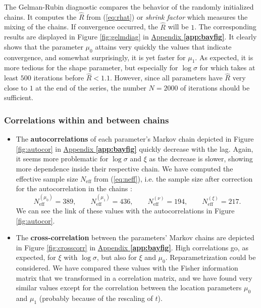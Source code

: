 The Gelman-Rubin diagnostic compares the behavior of the randomly initialized chains. It computes the $\hat{R}$ from (\ref{eq:rhat}) or \emph{shrink factor} which measures the mixing of the chains. If convergence occurred, the $\hat{R}$ will be $1$.
The corresponding results are displayed in Figure \ref{fig:gelmdiag} in \hyperref[app:bayfig]{Appendix \textbf{\ref{app:bayfig}}}. It clearly shows that the parameter $\mu_0$ attains very quickly the values that indicate convergence, and somewhat surprisingly, it is yet faster for $\mu_1$.
As expected, it is more tedious for the shape parameter, but especially for $\log\sigma$ for which takes at least $500$ iterations before $\hat{R}<1.1$. However, since all parameters have $\hat{R}$ very close to $1$ at the end of the series, the number $N=2000$ of iterations should be sufficient.



\subsubsection*{Correlations within and between chains}


\begin{itemize}
	\item The \textbf{autocorrelations} of each parameter's Markov chain depicted in Figure \ref{fig:autocor} in \hyperref[app:bayfig]{Appendix \textbf{\ref{app:bayfig}}} quickly decrease with the lag. Again, it seems more problematic for $\log\sigma$ and $\xi$ as the decrease is slower, showing more dependence inside their respective chain.	
	We have computed the effective sample size $N_{\text{eff}}$ from (\ref{eq:neff}), i.e. the sample size after correction for the autocorrelation in the chains :
	\begin{equation}
		N_{\text{eff}}^{(\mu_0)} = 389, \qquad 	N_{\text{eff}}^{(\mu_1)} = 436, \qquad 	N_{\text{eff}}^{(\nu)} = 194, \qquad	N_{\text{eff}}^{(\xi)} = 217.
	\end{equation}
	We can see the link of these values with the autocorrelations in Figure \ref{fig:autocor}.
	
	\item The \textbf{cross-correlation} between the parameters' Markov chains are depicted in Figure \ref{fig:crosscorr} in \hyperref[app:bayfig]{Appendix \textbf{\ref{app:bayfig}}}. High correlations go, as expected, for $\xi$ with $\log\sigma$, but also for $\xi$ and $\mu_0$. Reparametrization could be considered. We have compared these values with the Fisher information matrix that we transformed in a correlation matrix, and we have found very similar values except for the correlation between the location parameters $\mu_0$ and $\mu_1$ (probably because of the rescaling of $t$).
\end{itemize}


